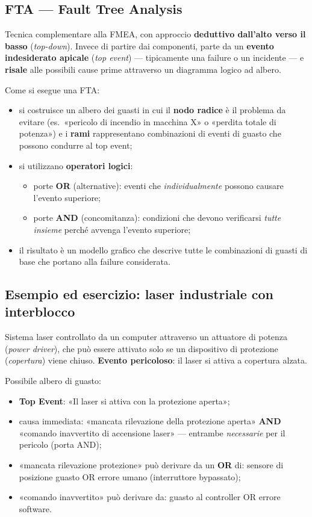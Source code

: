 \subsection{FTA — Fault Tree Analysis}
\begin{defn}[FTA]
Tecnica complementare alla FMEA, con approccio \textbf{deduttivo dall'alto verso il basso} (\emph{top-down}). Invece di partire dai componenti, parte da un \textbf{evento indesiderato apicale} (\emph{top event}) — tipicamente una failure o un incidente — e \textbf{risale} alle possibili cause prime attraverso un diagramma logico ad albero.
\end{defn}

Come si esegue una FTA:
\begin{itemize}
    \item si costruisce un albero dei guasti in cui il \textbf{nodo radice} è il problema da evitare (es.\ «pericolo di incendio in macchina X» o «perdita totale di potenza») e i \textbf{rami} rappresentano combinazioni di eventi di guasto che possono condurre al top event;
    \item si utilizzano \textbf{operatori logici}:
    \begin{itemize}
        \item porte \textbf{OR} (alternative): eventi che \emph{individualmente} possono causare l'evento superiore;
        \item porte \textbf{AND} (concomitanza): condizioni che devono verificarsi \emph{tutte insieme} perché avvenga l'evento superiore;
    \end{itemize}
    \item il risultato è un modello grafico che descrive tutte le combinazioni di guasti di base che portano alla failure considerata.
\end{itemize}

\subsection{Esempio ed esercizio: laser industriale con interblocco}
\begin{ex}
Sistema laser controllato da un computer attraverso un attuatore di potenza (\emph{power driver}), che può essere attivato solo se un dispositivo di protezione (\emph{copertura}) viene chiuso. \textbf{Evento pericoloso}: il laser si attiva a copertura alzata.
\end{ex}

Possibile albero di guasto:
\begin{itemize}
    \item \textbf{Top Event}: «Il laser si attiva con la protezione aperta»;
    \item causa immediata: «mancata rilevazione della protezione aperta» \textbf{AND} «comando inavvertito di accensione laser» — entrambe \emph{necessarie} per il pericolo (porta AND);
    \item «mancata rilevazione protezione» può derivare da un \textbf{OR} di: sensore di posizione guasto OR errore umano (interruttore bypassato);
    \item «comando inavvertito» può derivare da: guasto al controller OR errore software.
\end{itemize}

